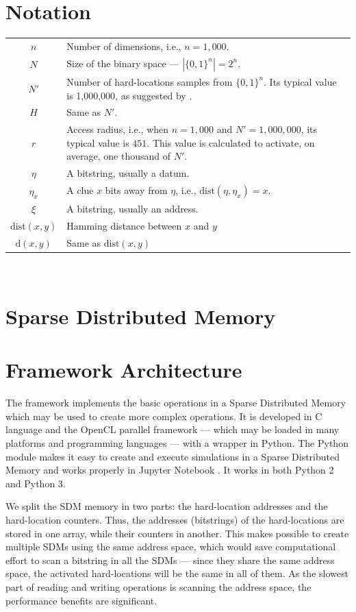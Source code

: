 \chapter{Notation}

\begin{tabular}{cp{\textwidth}}
  $n$ & Number of dimensions, i.e., $n=1,000$. \\
  $N$ & Size of the binary space --- $|\{0, 1\}^n| = 2^n$. \\
  $N'$ & Number of hard-locations samples from $\{0, 1\}^n$. Its typical value is 1,000,000, as suggested by \citet{Kanerva1988}. \\
  $H$ & Same as $N'$. \\
  $r$ & Access radius, i.e., when $n=1,000$ and $N'=1,000,000$, its typical value is $451$. This value is calculated to activate, on average, one thousand of $N'$. \\
  $\eta$ & A bitstring, usually a datum. \\
  $\eta_x$ & A clue $x$ bits away from $\eta$, i.e., $\text{dist}(\eta, \eta_x) = x$. \\
  $\xi$ & A bitstring, usually an address. \\
  $\text{dist}(x, y)$ & Hamming distance between $x$ and $y$ \\
  $\text{d}(x, y)$ & Same as $\text{dist}(x, y)$
\end{tabular}\\

\chapter{Sparse Distributed Memory}




\chapter{Framework Architecture}

The framework implements the basic operations in a Sparse Distributed Memory which may be used to create more complex operations. It is developed in C language and the OpenCL parallel framework --- which may be loaded in many platforms and programming languages --- with a wrapper in Python. The Python module makes it easy to create and execute simulations in a Sparse Distributed Memory and works properly in Jupyter Notebook \citep{kluyver2016jupyter}. It works in both Python 2 and Python 3.

We split the SDM memory in two parts: the hard-location addresses and the hard-location counters. Thus, the addresses (bitstrings) of the hard-locations are stored in one array, while their counters in another. This makes possible to create multiple SDMs using the same address space, which would save computational effort to scan a bitstring in all the SDMs --- since they share the same address space, the activated hard-locations will be the same in all of them. As the slowest part of reading and writing operations is scanning the address space, the performance benefits are significant.

